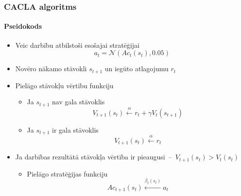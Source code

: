 \documentclass[xetex,mathserif]{beamer}
\begin{document}
  \begin{frame}
    \frametitle{CACLA algoritms}
    \framesubtitle{Pseidokods}
    \begin{itemize}
      \item Veic darbību atbilstoši esošajai stratēģijai
        \begin{equation*}
          a_t = \mathcal{N}\left(Ac_t(s_t), 0.05\right)
        \end{equation*}
      \item Novēro nākamo stāvokli $s_{t+1}$ un iegūto atlagojumu $r_{t}$
      \item Pielāgo stāvokļu vērtību funkciju
        \begin{itemize}
          \item Ja $s_{t+1}$ nav gala stāvoklis
            \begin{equation*}
              V_{t+1}(s_t) \xleftarrow{\alpha} r_t + \gamma V_t(s_{t + 1})
            \end{equation*}
          \item Ja $s_{t+1}$ ir gala stāvoklis
            \begin{equation*}
              V_{t+1}(s_t) \xleftarrow{\alpha} r_t
            \end{equation*}
        \end{itemize}
      \item Ja darbības rezultātā stāvokļa vērtība ir pieaugusi~--~$V_{t+1}(s_t)
        > V_t(s_t)$
        \begin{itemize}
          \item Pielāgo stratēģijas funkciju
            \begin{equation*}
              Ac_{t+1}(s_t) \xleftarrow{\beta_t(s_t)} a_t
            \end{equation*}
        \end{itemize}
    \end{itemize}
  \end{frame}

\end{document}
